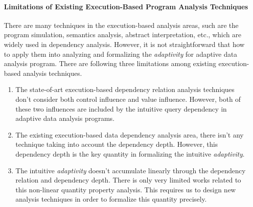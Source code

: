 \paragraph{Limitations of Existing Execution-Based Program Analysis Techniques}
There are many techniques in the execution-based analysis areas, such are the program simulation, 
semantics analysis, abstract interpretation, etc., which are widely used in dependency analysis. 
However, it is not straightforward that how to apply them into analyzing and formalizing the \emph{adaptivity}
for adaptive data analysis program.
There are following three limitations among existing execution-based analysis techniques.
\begin{enumerate}
\item The state-of-art execution-based dependency relation analysis techniques don't
consider both control influence and value influence. However, both of these
two influences are included by the intuitive query dependency 
in adaptive data analysis programs.
\item The existing execution-based data dependency analysis area, there isn't any technique taking into account
the dependency depth. However, this dependency depth is the key quantity in formalizing the intuitive \emph{adaptivity}.
\item The intuitive \emph{adaptivity} doesn't accumulate linearly through the dependency relation and 
dependency depth. There is only very limited works related to this non-linear quantity property analysis.
This requires us to design new analysis techniques in order to formalize this quantity precisely.
\end{enumerate}
%
